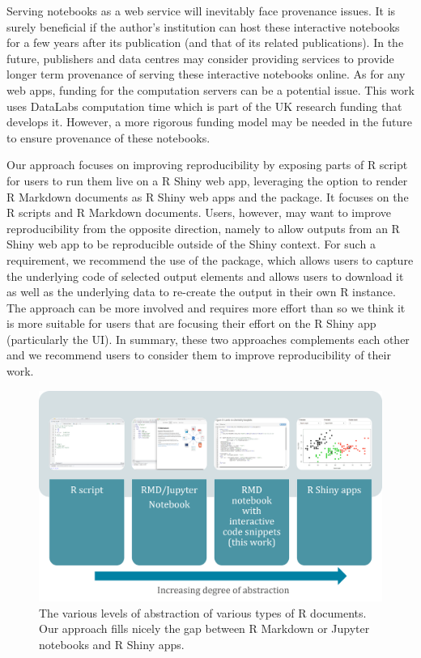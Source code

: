 Serving notebooks as a web service will inevitably face provenance
issues. It is surely beneficial if the author's institution can host
these interactive notebooks for a few years after its publication (and
that of its related publications). In the future, publishers and data
centres may consider providing services to provide longer term
provenance of serving these interactive notebooks online. As for any web
apps, funding for the computation servers can be a potential issue. This
work uses DataLabs computation time which is part of the UK research
funding that develops it. However, a more rigorous funding model may be
needed in the future to ensure provenance of these notebooks.

Our approach focuses on improving reproducibility by exposing parts of R
script for users to run them live on a R Shiny web app, leveraging the
option to render R Markdown documents as R Shiny web apps and the
 package. It focuses on the R scripts and R Markdown
documents. Users, however, may want to improve reproducibility from the
opposite direction, namely to allow outputs from an R Shiny web app to
be reproducible outside of the Shiny context. For such a requirement, we
recommend the use of the  \citep{shinymeta} package,
which allows users to capture the underlying code of selected output
elements and allows users to download it as well as the underlying data
to re-create the output in their own R instance. The 
approach can be more involved and requires more effort than
 so we think it is more suitable for users that are
focusing their effort on the R Shiny app (particularly the UI). In
summary, these two approaches complements each other and we recommend
users to consider them to improve reproducibility of their work.

\begin{Schunk}
\begin{figure}
\includegraphics[width=\textwidth]{learnr_abstraction} \caption[The various levels of abstraction of various types of R documents]{The various levels of abstraction of various types of R documents. Our approach fills nicely the gap between R Markdown or Jupyter notebooks and R Shiny apps.}\label{fig:fig1}
\end{figure}
\end{Schunk}

